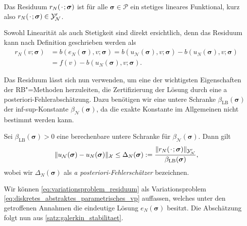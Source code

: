 \documentclass[../main.tex]{subfiles}
\begin{document}
\begin{Lemma}
\label{lemma:rbm_residuum_ist_funktional}
    Das Residuum $r_{N}({\mkern2mu\cdot\mkern2mu}; \bm \sigma)$ ist für alle $\bm \sigma \in \mathcal P$ ein stetiges lineares Funktional, kurz also $r_{N}({\mkern2mu\cdot\mkern2mu}; \bm \sigma) \in \mathcal Y_{\mathcal N}'$.

    \begin{Beweis}
        Sowohl Linearität als auch Stetigkeit sind direkt ersichtlich, denn das Residuum kann nach Definition geschrieben werden als
        \begin{equation}
            \begin{aligned}
            r_{N}(v; \bm \sigma)
            &= b(e_{N}(\bm \sigma), v; \bm \sigma)
            = b(u_{\mathcal N}(\bm \sigma), v; \bm \sigma) - b(u_{N}(\bm \sigma), v; \bm \sigma)
            \\&= f(v) - b(u_{N}(\bm \sigma), v; \bm \sigma).
            \end{aligned}
        \end{equation}
    \end{Beweis}
\end{Lemma}

Das Residuum lässt sich nun verwenden, um eine der wichtigsten Eigenschaften der RB"=Methoden herzuleiten, die Zertifizierung der Lösung durch eine a posteriori-Fehlerabschätzung.
Dazu benötigen wir eine untere Schranke $\beta_{\mathrm{LB}}(\bm \sigma)$ der inf-sup-Konstante $\beta_{\mathcal N}(\bm \sigma)$, da die exakte Konstante im Allgemeinen nicht bestimmt werden kann.

\begin{Lemma}
\label{lemma:rbm_fehler_schranke}
    Sei $\beta_{\mathrm{LB}}(\bm \sigma) > 0$ eine berechenbare untere Schranke für $\beta_{\mathcal N}(\bm \sigma)$.
    Dann gilt
    \begin{equation}
        \lVert u_{\mathcal N}(\bm \sigma) - u_{N}(\bm \sigma)\rVert_{\mathcal X} \leq \Delta_{N}(\bm \sigma) := \frac{\lVert r_{N}({\mkern2mu\cdot\mkern2mu}; \bm \sigma)\rVert_{\mathcal Y_{\mathcal N}'}}{\beta_{\mathrm{LB}}(\bm \sigma)},
    \end{equation}
    wobei wir $\Delta_{N}(\bm \sigma)$ als \emph{a posteriori-Fehlerschätzer} bezeichnen.

    \begin{Beweis}
        Wir können \cref{eq:variationsproblem_residuum} als Variationsproblem \cref{eq:diskretes_abstraktes_parametrisches_vp} auffassen, welches unter den getroffenen Annahmen die eindeutige Lösung $e_{N}(\bm \sigma)$ besitzt.
        Die Abschätzung folgt nun aus \cref{satz:galerkin_stabilitaet}.
    \end{Beweis}
\end{Lemma}
\end{document}
